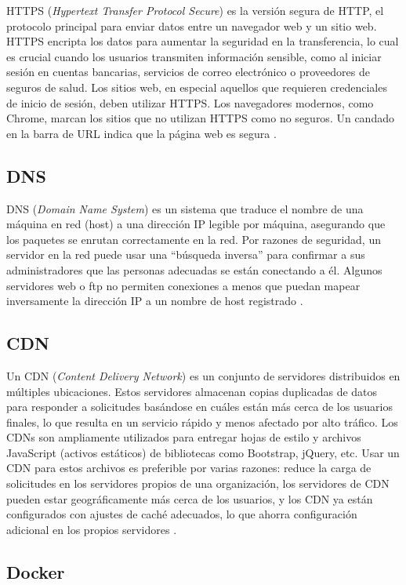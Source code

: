 HTTPS (\textit{Hypertext Transfer Protocol Secure}) es la versión segura de HTTP,
el protocolo principal para enviar datos entre un navegador web y un sitio web.
HTTPS encripta los datos para aumentar la seguridad en la transferencia, lo cual
es crucial cuando los usuarios transmiten información sensible, como al iniciar
sesión en cuentas bancarias, servicios de correo electrónico o proveedores de
seguros de salud. Los sitios web, en especial aquellos que requieren credenciales
de inicio de sesión, deben utilizar HTTPS. Los navegadores modernos, como Chrome,
marcan los sitios que no utilizan HTTPS como no seguros. Un candado en la barra
de URL indica que la página web es segura \cite{Cloudflare_HTTPS}.

\subsection{DNS}
DNS (\textit{Domain Name System}) es un sistema que traduce el nombre de una
máquina en red (host) a una dirección IP legible por máquina, asegurando que
los paquetes se enrutan correctamente en la red. Por razones de seguridad, un
servidor en la red puede usar una ``búsqueda inversa'' para confirmar a sus
administradores que las personas adecuadas se están conectando a él. Algunos
servidores web o ftp no permiten conexiones a menos que puedan mapear inversamente
la dirección IP a un nombre de host registrado \cite{cornell_dns}.

\subsection{CDN}
Un CDN (\textit{Content Delivery Network}) es un conjunto de servidores
distribuidos en múltiples ubicaciones. Estos servidores almacenan copias
duplicadas de datos para responder a solicitudes basándose en cuáles están más
cerca de los usuarios finales, lo que resulta en un servicio rápido y menos
afectado por alto tráfico. Los CDNs son ampliamente utilizados para entregar
hojas de estilo y archivos JavaScript (activos estáticos) de bibliotecas como
Bootstrap, jQuery, etc. Usar un CDN para estos archivos es preferible por varias
razones: reduce la carga de solicitudes en los servidores propios de una
organización, los servidores de CDN pueden estar geográficamente más cerca de
los usuarios, y los CDN ya están configurados con ajustes de caché adecuados,
lo que ahorra configuración adicional en los propios servidores \cite{mdn_cdn}.

\subsection{Docker}

